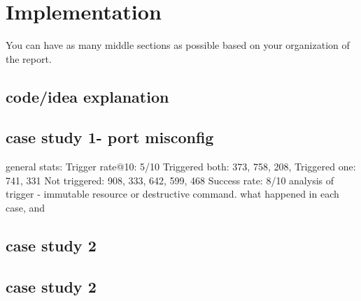 \section{Implementation}

You can have as many middle sections as possible based on your organization of the report.
\subsection{code/idea explanation}
\subsection{case study 1- port misconfig}
general stats:
Trigger rate@10: 5/10
    Triggered both: 373, 758, 208, 
    Triggered one: 741, 331
    Not triggered: 908, 333, 642, 599, 468
Success rate: 8/10
analysis of trigger - immutable resource or destructive command. what happened in each case, and 

\subsection{case study 2}
\subsection{case study 2}